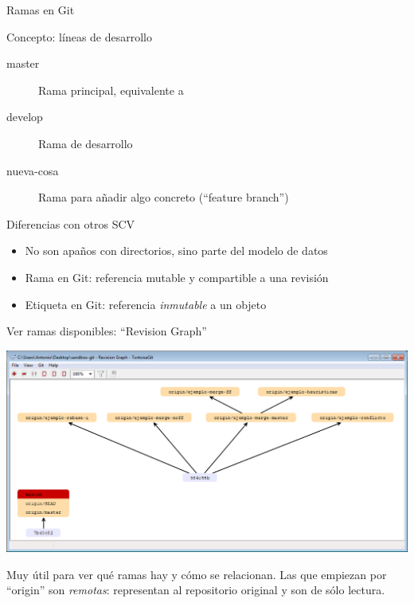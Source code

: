 \documentclass[xcolor=svgnames]{beamer}
\newcommand*{\rama}[1]{\structure{#1}}
\begin{document}
\begin{frame}{Ramas en Git}
  \begin{block}{Concepto: líneas de desarrollo}
    \begin{description}
    \item[master]      Rama principal, equivalente a \rama{trunk}
    \item[develop]    Rama de desarrollo
    \item[nueva-cosa] Rama para añadir algo concreto
      (\foreignquote{english}{feature branch})
    \end{description}
  \end{block}

  \begin{block}{Diferencias con otros SCV}
    \begin{itemize}
    \item No son apaños con directorios, sino parte del modelo de datos
    \item Rama en Git: referencia mutable y compartible a una revisión
    \item Etiqueta en Git: referencia \emph{inmutable} a un objeto
    \end{itemize}
  \end{block}
\end{frame}

\begin{frame}{Ver ramas disponibles: ``Revision Graph''}
  \begin{center}
    \includegraphics[width=\textwidth,height=.6\textheight,keepaspectratio]{tomas/revgraph}
  \end{center}

  Muy útil para ver qué ramas hay y cómo se relacionan. Las que
  empiezan por ``origin'' son \emph{remotas}: representan al
  repositorio original y son de sólo lectura.
\end{frame}
\end{document}
